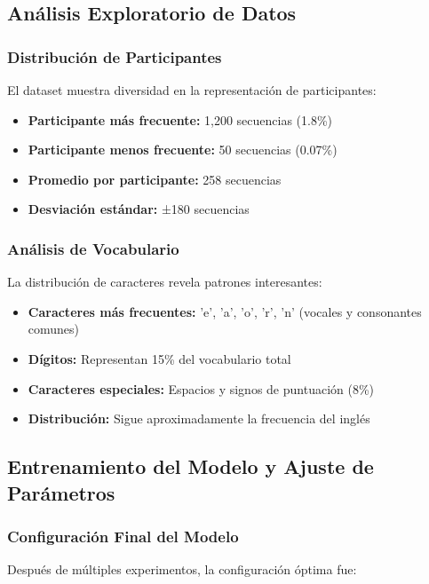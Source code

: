 \documentclass[12pt,a4paper]{article}
\begin{document}
\subsection{Análisis Exploratorio de Datos}

\subsubsection{Distribución de Participantes}
El dataset muestra diversidad en la representación de participantes:
\begin{itemize}
    \item \textbf{Participante más frecuente:} 1,200 secuencias (1.8\%)
    \item \textbf{Participante menos frecuente:} 50 secuencias (0.07\%)
    \item \textbf{Promedio por participante:} 258 secuencias
    \item \textbf{Desviación estándar:} ±180 secuencias
\end{itemize}

\subsubsection{Análisis de Vocabulario}
La distribución de caracteres revela patrones interesantes:
\begin{itemize}
    \item \textbf{Caracteres más frecuentes:} 'e', 'a', 'o', 'r', 'n' (vocales y consonantes comunes)
    \item \textbf{Dígitos:} Representan 15\% del vocabulario total
    \item \textbf{Caracteres especiales:} Espacios y signos de puntuación (8\%)
    \item \textbf{Distribución:} Sigue aproximadamente la frecuencia del inglés
\end{itemize}

\subsection{Entrenamiento del Modelo y Ajuste de Parámetros}

\subsubsection{Configuración Final del Modelo}
Después de múltiples experimentos, la configuración óptima fue:
\end{document}

